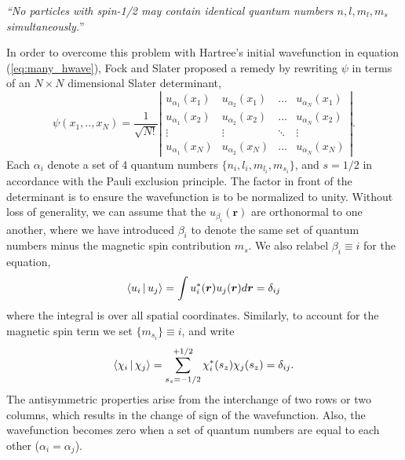 \protect\textit{``No particles with spin-1/2 may contain identical quantum numbers $n, l, m_l, m_s$ simultaneously.}''

In order to overcome this problem with Hartree's initial wavefunction in equation (\ref{eq:many_hwave}), Fock and Slater proposed a remedy by rewriting $\psi$ in terms of an $N\times N$ dimensional Slater determinant,
	\begin{equation}\label{eq:many_slaterdet}
	\psi(x_1,..,x_N) = \frac{1}{\sqrt{N!}}\left| \begin{array}{cccc}
	u_{\alpha_1}(x_1) & u_{\alpha_2}(x_1) & ... & u_{\alpha_N}(x_1)\\
	u_{\alpha_1}(x_2) & u_{\alpha_2}(x_2) & ... & u_{\alpha_N}(x_2)\\
	\vdots & \vdots & \ddots & \vdots \\
	u_{\alpha_1}(x_N) & u_{\alpha_2}(x_N) & ... & u_{\alpha_N}(x_N) \end{array} \right|.
	\end{equation}
Each $\alpha_i$ denote a set of 4 quantum numbers $\{n_i, l_i, m_{l_i}, m_{s_i}\}$, and $s=1/2$ in accordance with the Pauli exclusion principle. The factor in front of the determinant is to ensure the wavefunction is to be normalized to unity. Without loss of generality, we can assume that the $u_{\beta_i}(\boldsymbol{r})$ are orthonormal to one another, where we have introduced $\beta_i$ to denote the same set of quantum numbers minus the magnetic spin contribution $m_s$. We also relabel $\beta_i \equiv i$ for the equation,
	\begin{equation}\label{eq:many_unorm}
	\Braket{u_i | u_j} = \int u_i^*(\boldsymbol{r})u_j(\boldsymbol{r})d\boldsymbol{r} = \delta_{ij}
	\end{equation}
	where the integral is over all spatial coordinates. Similarly, to account for the magnetic spin term we set $\{m_{s_i}\} \equiv i$, and write
	\begin{equation}\label{eq:many_spinnorm}
	\Braket{\chi_{i} | \chi_{j}} = \sum_{s_z=-1/2}^{+1/2}  \chi_{i}^*(s_z)\chi_{j}(s_z)= \delta_{ij}.
	\end{equation}
The antisymmetric properties arise from the interchange of two rows or two columns, which results in the change of sign of the wavefunction. Also, the wavefunction becomes zero when a set of quantum numbers are equal to each other ($\alpha_i=\alpha_j$).

